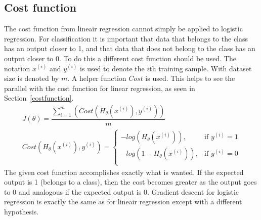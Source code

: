 \subsection{Cost function}
The cost function from lineair regression cannot simply be applied to logistic regression. For classification it is important that data that belongs to the class has an output closer to 1, and that data that does not belong to the class has an output closer to 0. To do this a different cost function should be used. The notation $x^{(i)}$ and $y^{(i)}$ is used to denote the $i$th training sample. With dataset size is denoted by $m$. A helper function $Cost$ is used. This helps to see the parallel with the cost function for linear regression, as seen in Section~\ref{costfunction}. 
\begin{gather}
J(\theta) = \dfrac{\sum\limits_{i=1}^m(Cost(H_\theta(x^{(i)}), y^{(i)}))}{m}\\
  Cost(H_\theta(x^{(i)}), y^{(i)}) =	\begin{cases}
        	 									     - log(H_\theta(x^{(i)})), & \text{if } y^{(i)} = 1\\
        									        - log(1 - H_\theta(x^{(i)})), & \text{if } y^{(i)} = 0\\
            									\end{cases}
\end{gather}
The given cost function accomplishes exactly what is wanted. If the expected output is 1 (belongs to a class), then the cost becomes greater as the output goes to 0 and analogous if the expected output is 0. Gradient descent for logistic regression is exactly the same as for lineair regression except with a different hypothesis.

